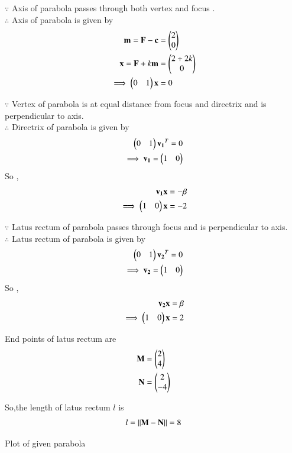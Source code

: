 \documentclass[journal,12pt,twocolumn]{IEEEtran}
\begin{document}
$\because$
Axis of parabola passes through both vertex and focus .
\\
$\therefore$
Axis of parabola is given by
\begin{align}
\mathbf{m} =\mathbf{F} - \mathbf{c} &= \begin{pmatrix}2\\0\end{pmatrix}
\\
\mathbf{x} = \mathbf{F} + k\mathbf{m} &= \begin{pmatrix}2+2k \\ 0\end{pmatrix}
\\
\implies \begin{pmatrix}0 & 1\end{pmatrix}\mathbf{x} &= 0
\end{align}

$\because$
Vertex of parabola is at equal distance from focus and directrix and is perpendicular to axis.
\\
$\therefore$
Directrix of parabola is given by
\begin{align}
\begin{pmatrix}0 & 1\end{pmatrix}\mathbf{v_1}^T = 0
\\
\implies \mathbf{v_1} = \begin{pmatrix}1 & 0\end{pmatrix}
\end{align}
So , 
\begin{align}
\mathbf{v_1}\mathbf{x} = -\beta
\\
\implies \begin{pmatrix}1 & 0\end{pmatrix}\mathbf{x} = -2
\end{align}

$\because$
Latus rectum of parabola passes through focus and is perpendicular to axis.
\\
$\therefore$
Latus rectum of parabola is given by
\begin{align}
\begin{pmatrix}0 & 1\end{pmatrix}\mathbf{v_2}^T = 0
\\
\implies \mathbf{v_2} = \begin{pmatrix}1 & 0\end{pmatrix}
\end{align}
So , 
\begin{align}
\mathbf{v_2}\mathbf{x} = \beta
\\
\implies \begin{pmatrix}1 & 0\end{pmatrix}\mathbf{x} = 2
\end{align}

End points of latus rectum are
\begin{align}
\mathbf{M} &= \begin{pmatrix}2\\4\end{pmatrix}
\\
\mathbf{N} &= \begin{pmatrix}2\\-4\end{pmatrix}
\end{align}

So,the length of latus rectum $l$ is 
\begin{align}
l = \left\lVert\mathbf{M}-\mathbf{N}\right\rVert = 8
\end{align}

\newpage
Plot of given parabola
\end{document}
